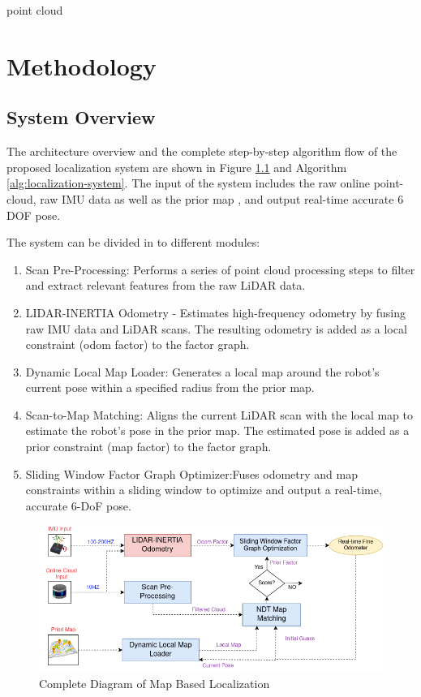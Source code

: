 point cloud\chapter{Methodology}
\label{ch:intro}

\section{System Overview}

The architecture overview and the complete step-by-step algorithm flow of the proposed localization system are shown in Figure \ref{fig:diagram-map-basedlocalization} and Algorithm \ref{alg:localization-system}. The input of the system includes the raw online point-cloud, raw IMU data as well as the prior map , and output real-time accurate 6 DOF pose.	

The system can be divided in to different modules:


\begin{enumerate}
	\item Scan Pre-Processing: Performs a series of point cloud processing steps to filter and extract relevant features from the raw LiDAR data.
	
	\item LIDAR-INERTIA Odometry - Estimates high-frequency odometry by fusing raw IMU data and LiDAR scans. The resulting odometry is added as a local constraint (odom factor) to the factor graph.
	
	\item Dynamic Local Map Loader: Generates a local map around the robot’s current pose within a specified radius from the prior map.
	
	
	\item Scan-to-Map Matching: Aligns the current LiDAR scan with the local map to estimate the robot's pose in the prior map. The estimated pose is added as a prior constraint (map factor) to the factor graph.
	
	\item Sliding Window Factor Graph Optimizer:Fuses odometry and map constraints within a sliding window to optimize and output a real-time, accurate 6-DoF pose.
	
	
\end{enumerate}

\begin{figure}
    \centering
    \includegraphics[width=1\linewidth]{images/system_overview.png}
    \caption{Complete Diagram of Map Based Localization}
    \label{fig:diagram-map-basedlocalization}
\end{figure}


